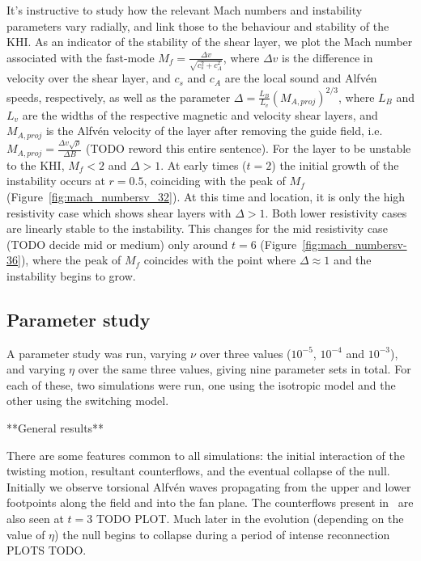 It's instructive to study how the relevant Mach numbers and instability parameters vary radially, and link those to the behaviour and stability of the KHI. As an indicator of the stability of the shear layer, we plot the Mach number associated with the fast-mode $M_f = \frac{\Delta v}{\sqrt{c_s^2 + c_A^2}}$, where $\Delta v$ is the difference in velocity over the shear layer, and $c_s$ and $c_A$ are the local sound and Alfv\'en speeds, respectively, as well as the parameter $\Delta = \frac{L_B}{L_v}(M_{A, proj})^{2/3}$, where $L_B$ and $L_v$ are the widths of the respective magnetic and velocity shear layers, and $M_{A, proj}$ is the Alfv\'en velocity of the layer after removing the guide field, i.e. $M_{A, proj} = \frac{\Delta v \sqrt{\rho}}{\Delta B}$ (TODO reword this entire sentence). For the layer to be unstable to the KHI, $M_f < 2$ and $\Delta > 1$. At early times ($t=2$) the initial growth of the instability occurs at $r=0.5$, coinciding with the peak of $M_f$ (Figure~\ref{fig:mach_numbersv_32}). At this time and location, it is only the high resistivity case which shows shear layers with $\Delta > 1$. Both lower resistivity cases are linearly stable to the instability. This changes for the mid resistivity case (TODO decide mid or medium) only around $t=6$ (Figure~\ref{fig:mach_numbersv-36}), where the peak of $M_f$ coincides with the point where $\Delta \approx 1$ and the instability begins to grow.


\subsection{Parameter study}

A parameter study was run, varying $\nu$ over three values ($10^{-5}$, $10^{-4}$ and $10^{-3}$), and varying $\eta$ over the same three values, giving nine parameter sets in total. For each of these, two simulations were run, one using the isotropic model and the other using the switching model.

**General results**

There are some features common to all simulations: the initial interaction of the twisting motion, resultant counterflows, and the eventual collapse of the null. Initially we observe torsional Alfv\'en waves propagating from the upper and lower footpoints along the field and into the fan plane. The counterflows present in~\cite{wyperKelvinHelmholtzInstabilityCurrentvortex2013} are also seen at $t=3$ TODO PLOT. Much later in the evolution (depending on the value of $\eta$) the null begins to collapse during a period of intense reconnection PLOTS TODO.

